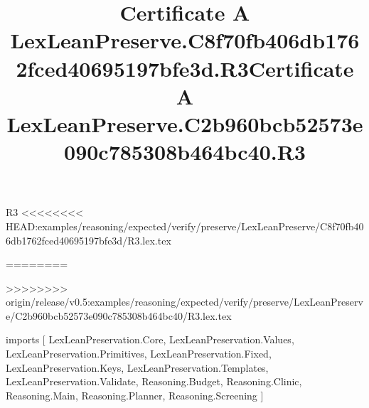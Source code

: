 \begin{lexlean}{R3}
<<<<<<<< HEAD:examples/reasoning/expected/verify/preserve/LexLeanPreserve/C8f70fb406db1762fced40695197bfe3d/R3.lex.tex
\title{Certificate A LexLeanPreserve.C8f70fb406db1762fced40695197bfe3d.R3}
========
\title{Certificate A LexLeanPreserve.C2b960bcb52573e090c785308b464bc40.R3}
>>>>>>>> origin/release/v0.5:examples/reasoning/expected/verify/preserve/LexLeanPreserve/C2b960bcb52573e090c785308b464bc40/R3.lex.tex
\begin{coremodule}
imports [
  LexLeanPreservation.Core,
  LexLeanPreservation.Values,
  LexLeanPreservation.Primitives,
  LexLeanPreservation.Fixed,
  LexLeanPreservation.Keys,
  LexLeanPreservation.Templates,
  LexLeanPreservation.Validate,
  Reasoning.Budget,
  Reasoning.Clinic,
  Reasoning.Main,
  Reasoning.Planner,
  Reasoning.Screening
]


\end{coremodule}
\end{lexlean}
